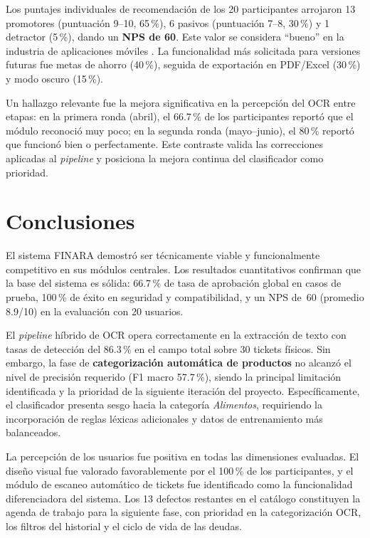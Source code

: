 \documentclass[10pt,twocolumn,letterpaper]{article}
\begin{document}
Los puntajes individuales de recomendación de los 20 participantes arrojaron 13 promotores
(puntuación 9--10, 65\,\%), 6 pasivos (puntuación 7--8, 30\,\%) y 1 detractor (5\,\%), dando
un \textbf{NPS de 60}. Este valor se considera ``bueno'' en la industria de aplicaciones móviles
\cite{BBVA_Finanzas}. La funcionalidad más solicitada para versiones futuras fue metas de ahorro
(40\,\%), seguida de exportación en PDF/Excel (30\,\%) y modo oscuro (15\,\%).

Un hallazgo relevante fue la mejora significativa en la percepción del OCR entre etapas: en la
primera ronda (abril), el 66.7\,\% de los participantes reportó que el módulo reconoció muy poco;
en la segunda ronda (mayo--junio), el 80\,\% reportó que funcionó bien o perfectamente. Este
contraste valida las correcciones aplicadas al \emph{pipeline} y posiciona la mejora continua
del clasificador como prioridad.


\section{Conclusiones}

El sistema FINARA demostró ser técnicamente viable y funcionalmente competitivo en sus módulos
centrales. Los resultados cuantitativos confirman que la base del sistema es sólida: 66.7\,\%
de tasa de aprobación global en casos de prueba, 100\,\% de éxito en seguridad y compatibilidad,
y un NPS de~60 (promedio 8.9/10) en la evaluación con 20 usuarios.

El \emph{pipeline} híbrido de OCR opera correctamente en la extracción de texto con tasas de
detección del 86.3\,\% en el campo total sobre 30 tickets físicos. Sin embargo, la fase de
\textbf{categorización automática de productos} no alcanzó el nivel de precisión requerido
(F1 macro 57.7\,\%), siendo la principal limitación identificada y la prioridad de la siguiente
iteración del proyecto. Específicamente, el clasificador presenta sesgo hacia la categoría
\textit{Alimentos}, requiriendo la incorporación de reglas léxicas adicionales y datos de
entrenamiento más balanceados.

La percepción de los usuarios fue positiva en todas las dimensiones evaluadas. El diseño visual
fue valorado favorablemente por el 100\,\% de los participantes, y el módulo de escaneo
automático de tickets fue identificado como la funcionalidad diferenciadora del sistema. Los
13 defectos restantes en el catálogo constituyen la agenda de trabajo para la siguiente fase,
con prioridad en la categorización OCR, los filtros del historial y el ciclo de vida de las
deudas.
\end{document}
